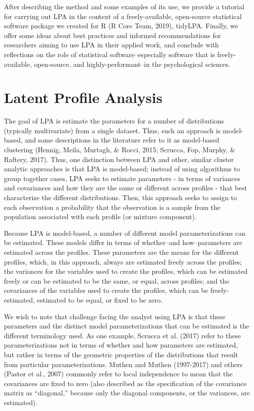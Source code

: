 \documentclass[man]{apa6}
\begin{document}
After describing the method and some examples of its use, we provide a tutorial
for carrying out LPA in the context of a freely-available, open-source
statistical software package we created for R (R Core Team, 2019), tidyLPA.
Finally, we offer some ideas about best practices and informed recommendations
for researchers aiming to use LPA in their applied work, and conclude with
reflections on the role of statistical software--especially software that is
freely-available, open-source, and highly-performant--in the psychological
sciences.

\hypertarget{latent-profile-analysis}{%
\section{Latent Profile Analysis}\label{latent-profile-analysis}}

The goal of LPA is estimate the parameters for a number of distributions
(typically multivariate) from a single dataset. Thus, such an approach is
model-based, and some descriptions in the literature refer to it as model-based
clustering (Hennig, Meila, Murtagh, \& Rocci, 2015; Scrucca, Fop, Murphy, \&
Raftery, 2017). Thus, one distinction between LPA and other, similar cluster
analytic approaches is that LPA is model-based; instead of using algorithms to
group together cases, LPA seeks to estimate parameters - in terms of variances
and covariances and how they are the same or different across profiles - that
best characterize the different distributions. Then, this approach seeks to
assign to each observation a probability that the observation is a sample from
the population associated with each profile (or mixture component).

Because LPA is model-based, a number of different model parameterizations can be
estimated. These models differ in terms of whether--and how--parameters are
estimated across the profiles. These parameters are the means for the different
profiles, which, in this approach, always are estimated freely across the
profiles; the variances for the variables used to create the profiles, which can
be estimated freely or can be estimated to be the same, or equal, across
profiles; and the covariances of the variables used to create the profiles,
which can be freely-estimated, estimated to be equal, or fixed to be zero.

We wish to note that challenge facing the analyst using LPA is that these
parameters and the distinct model parameterizations that can be estimated is the
different terminology used. As one example, Scrucca et al. (2017) refer to these
parameterizations not in terms of whether and how parameters are estimated, but
rather in terms of the geometric properties of the distributions that result
from particular parameterizations. Muthen and Muthen (1997-2017) and others
(Pastor et al., 2007) commonly refer to local independence to mean that the
covariances are fixed to zero (also described as the specification of the
covariance matrix as ``diagonal,'' because only the diagonal components, or the
variances, are estimated).
\end{document}
